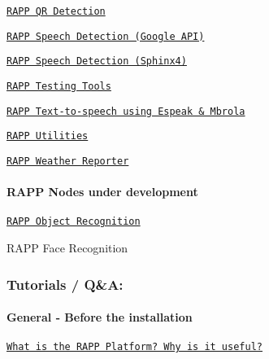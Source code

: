 \begin{DoxyItemize}
\item \href{https://github.com/rapp-project/rapp-platform/wiki/RAPP-QR-Detection}{\tt R\-A\-P\-P Q\-R Detection}
\item \href{https://github.com/rapp-project/rapp-platform/wiki/RAPP-Speech-Detection-using-Google-API}{\tt R\-A\-P\-P Speech Detection (Google A\-P\-I)}
\item \href{https://github.com/rapp-project/rapp-platform/wiki/RAPP-Speech-Detection-using-Sphinx4}{\tt R\-A\-P\-P Speech Detection (Sphinx4)}
\item \href{https://github.com/rapp-project/rapp-platform/wiki/RAPP-Testing-Tools}{\tt R\-A\-P\-P Testing Tools}
\item \href{https://github.com/rapp-project/rapp-platform/wiki/RAPP-Text-to-speech-using-Espeak-&-Mbrola}{\tt R\-A\-P\-P Text-\/to-\/speech using Espeak \& Mbrola}
\item \href{https://github.com/rapp-project/rapp-platform/wiki/RAPP-Utilities}{\tt R\-A\-P\-P Utilities}
\item \href{https://github.com/rapp-project/rapp-platform/wiki/RAPP-Weather-Reporter}{\tt R\-A\-P\-P Weather Reporter}
\end{DoxyItemize}

\paragraph*{R\-A\-P\-P Nodes under development}


\begin{DoxyItemize}
\item \href{https://github.com/rapp-project/rapp-platform/wiki/RAPP-Object-Recognition}{\tt R\-A\-P\-P Object Recognition}
\item R\-A\-P\-P Face Recognition
\end{DoxyItemize}

\subsubsection*{Tutorials / Q\&A\-:}

\paragraph*{General -\/ Before the installation}


\begin{DoxyItemize}
\item \href{https://github.com/rapp-project/rapp-platform/wiki/What-is-the-RAPP-Platform%3F-Why-is-it-useful%3F}{\tt What is the R\-A\-P\-P Platform? Why is it useful?}
\end{DoxyItemize}

